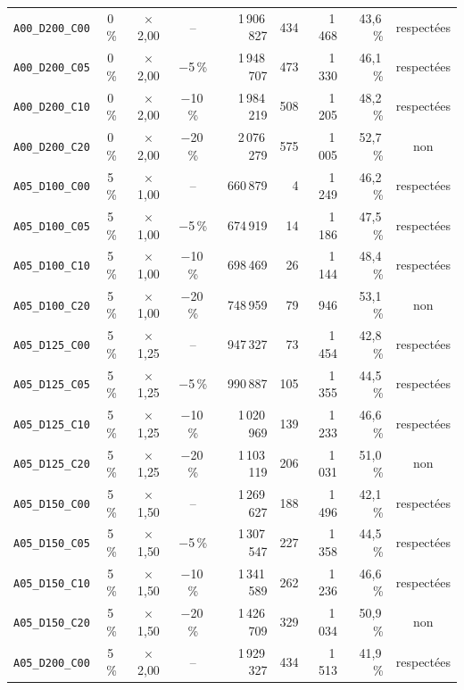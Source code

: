 {\begin{longtable}{lcccrrrrc}
\texttt{A00\_D200\_C00} & 0\,\% & $\times$2{,}00 & -- & 1\,906\,827 & 434 & 1\,468 & 43{,}6\,\% & respectées \\
\texttt{A00\_D200\_C05} & 0\,\% & $\times$2{,}00 & $-$5\,\% & 1\,948\,707 & 473 & 1\,330 & 46{,}1\,\% & respectées \\
\texttt{A00\_D200\_C10} & 0\,\% & $\times$2{,}00 & $-$10\,\% & 1\,984\,219 & 508 & 1\,205 & 48{,}2\,\% & respectées \\
\texttt{A00\_D200\_C20} & 0\,\% & $\times$2{,}00 & $-$20\,\% & 2\,076\,279 & 575 & 1\,005 & 52{,}7\,\% & non \\
\texttt{A05\_D100\_C00} & 5\,\% & $\times$1{,}00 & -- & 660\,879 & 4 & 1\,249 & 46{,}2\,\% & respectées \\
\texttt{A05\_D100\_C05} & 5\,\% & $\times$1{,}00 & $-$5\,\% & 674\,919 & 14 & 1\,186 & 47{,}5\,\% & respectées \\
\texttt{A05\_D100\_C10} & 5\,\% & $\times$1{,}00 & $-$10\,\% & 698\,469 & 26 & 1\,144 & 48{,}4\,\% & respectées \\
\texttt{A05\_D100\_C20} & 5\,\% & $\times$1{,}00 & $-$20\,\% & 748\,959 & 79 & 946 & 53{,}1\,\% & non \\
\texttt{A05\_D125\_C00} & 5\,\% & $\times$1{,}25 & -- & 947\,327 & 73 & 1\,454 & 42{,}8\,\% & respectées \\
\texttt{A05\_D125\_C05} & 5\,\% & $\times$1{,}25 & $-$5\,\% & 990\,887 & 105 & 1\,355 & 44{,}5\,\% & respectées \\
\texttt{A05\_D125\_C10} & 5\,\% & $\times$1{,}25 & $-$10\,\% & 1\,020\,969 & 139 & 1\,233 & 46{,}6\,\% & respectées \\
\texttt{A05\_D125\_C20} & 5\,\% & $\times$1{,}25 & $-$20\,\% & 1\,103\,119 & 206 & 1\,031 & 51{,}0\,\% & non \\
\texttt{A05\_D150\_C00} & 5\,\% & $\times$1{,}50 & -- & 1\,269\,627 & 188 & 1\,496 & 42{,}1\,\% & respectées \\
\texttt{A05\_D150\_C05} & 5\,\% & $\times$1{,}50 & $-$5\,\% & 1\,307\,547 & 227 & 1\,358 & 44{,}5\,\% & respectées \\
\texttt{A05\_D150\_C10} & 5\,\% & $\times$1{,}50 & $-$10\,\% & 1\,341\,589 & 262 & 1\,236 & 46{,}6\,\% & respectées \\
\texttt{A05\_D150\_C20} & 5\,\% & $\times$1{,}50 & $-$20\,\% & 1\,426\,709 & 329 & 1\,034 & 50{,}9\,\% & non \\
\texttt{A05\_D200\_C00} & 5\,\% & $\times$2{,}00 & -- & 1\,929\,327 & 434 & 1\,513 & 41{,}9\,\% & respectées \\

\end{longtable}}
